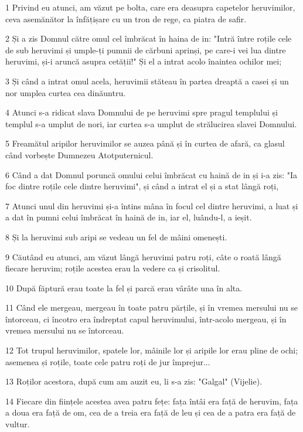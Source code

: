 \par 1 Privind eu atunci, am văzut pe bolta, care era deasupra capetelor heruvimilor, ceva asemănător la înfățișare cu un tron de rege, ca piatra de safir.
\par 2 Și a zis Domnul către omul cel îmbrăcat în haina de in: "Intră între roțile cele de sub heruvimi și umple-ți pumnii de cărbuni aprinși, pe care-i vei lua dintre heruvimi, și-i aruncă asupra cetății!" Și el a intrat acolo înaintea ochilor mei;
\par 3 Și când a intrat omul acela, heruvimii stăteau în partea dreaptă a casei și un nor umplea curtea cea dinăuntru.
\par 4 Atunci s-a ridicat slava Domnului de pe heruvimi spre pragul templului și templul s-a umplut de nori, iar curtea s-a umplut de strălucirea slavei Domnului.
\par 5 Freamătul aripilor heruvimilor se auzea până și în curtea de afară, ca glasul când vorbește Dumnezeu Atotputernicul.
\par 6 Când a dat Domnul poruncă omului celui îmbrăcat cu haină de in și i-a zis: "Ia foc dintre roțile cele dintre heruvimi", și când a intrat el și a stat lângă roți,
\par 7 Atunci unul din heruvimi și-a întins mâna în focul cel dintre heruvimi, a luat și a dat în pumni celui îmbrăcat în haină de in, iar el, luându-l, a ieșit.
\par 8 Și la heruvimi sub aripi se vedeau un fel de mâini omenești.
\par 9 Căutând eu atunci, am văzut lângă heruvimi patru roți, câte o roată lângă fiecare heruvim; roțile acestea erau la vedere ca și crisolitul.
\par 10 După făptură erau toate la fel și parcă erau vârâte una în alta.
\par 11 Când ele mergeau, mergeau în toate patru părțile, și în vremea mersului nu se întorceau, ci încotro era îndreptat capul heruvimului, într-acolo mergeau, și în vremea mersului nu se întorceau.
\par 12 Tot trupul heruvimilor, spatele lor, mâinile lor și aripile lor erau pline de ochi; asemenea și roțile, toate cele patru roți de jur împrejur...
\par 13 Roților acestora, după cum am auzit eu, li s-a zis: "Galgal" (Vijelie).
\par 14 Fiecare din ființele acestea avea patru fețe: fața întâi era față de heruvim, fața a doua era față de om, cea de a treia era față de leu și cea de a patra era față de vultur.
